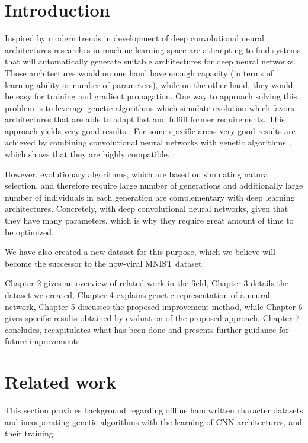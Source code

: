 \documentclass[eng]{simposium}
\begin{document}
\section{Introduction} 

Inspired by modern trends in development of deep convolutional neural architectures \cite{28}\cite{29} researches in machine  
learning space are attempting to find systems that will automatically generate suitable architectures for deep neural networks. 
Those architectures would on one hand have enough capacity (in terms of learning ability or number of parameters), while on  
the other hand, they would be easy for training and gradient propagation. 
One way to approach solving this problem is to leverage genetic algorithms which simulate evolution which favors architectures  
that are able to adapt fast and fulfill former requirements. 
This approach yields very good results \cite{5}\cite{30}\cite{31}.  
For some specific areas very good results are achieved by combining convolutional neural networks with genetic algorithms \cite{2}\cite{32}, 
which shows that they are highly compatible.  

However, evolutionary algorithms, which are based on simulating natural selection, and therefore require large number  
of generations and additionally large number of individuals in each generation are complementary with deep learning architectures. 
Concretely, with deep convolutional neural networks, given that they have many parameters, which is why they require great  
amount of time to be optimized.    

We have also created a new dataset for this purpose, which we believe will become the successor to the now-viral MNIST dataset. 

Chapter 2 gives an overview of related work in the field, Chapter 3 details the dataset we created, 
Chapter 4 explains genetic representation of a neural network, 
Chapter 5 discusses the proposed improvement method, while Chapter 6 gives specific results obtained by evaluation of the proposed approach. 
Chapter 7 concludes, recapitulates what has been done and presents further guidance for future improvements. 

\section{Related work} 

This section provides background regarding offline handwritten character datasets and incorporating genetic algorithms  
with the learning of CNN architectures, and their training.  
\end{document}
